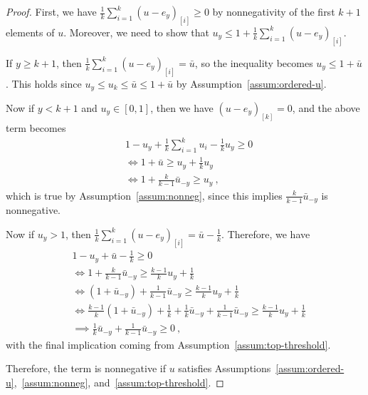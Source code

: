 \documentclass[12pt]{article}
\begin{document}
\begin{proof}
	First, we have $\frac 1 k \sum_{i=1}^k (u-e_y)_{[i]} \geq 0$ by nonnegativity of the first $k+1$ elements of $u$.
	Moreover, we need to show that $u_y \leq 1 + \frac 1 k \sum_{i=1}^k (u-e_y)_{[i]}$.
	
	If $y \geq k+1$, then $\frac 1 k \sum_{i=1}^k (u-e_y)_{[i]} = \bar u$, so the inequality becomes $u_y \leq 1 + \bar u$.
	This holds since $u_y \leq u_k \leq \bar u \leq 1 + \bar u$ by Assumption~\ref{assum:ordered-u}.
	
	Now if $y < k+1$ and $u_y \in [0,1]$, then we have $(u-e_y)_{[k]} = 0$, and the above term becomes
	\begin{align*}
	&1 -u_y + \frac{1}{k} \sum_{i=1}^{k} u_i - \frac 1 k u_y \geq 0\\
	&\iff 1 + \bar u \geq u_y + \frac{1}{k} u_y\\
	&\iff 1 + \frac k {k-1} \bar u_{-y} \geq u_y~,~
	\end{align*}
	which is true by Assumption~\ref{assum:nonneg}, since this implies $\frac{k}{k-1} \bar u_{-y}$ is nonnegative.
	
	Now if $u_y > 1$, then $\frac 1 k \sum_{i=1}^k (u-e_y)_{[i]} = \bar u - \frac 1 k$.
	Therefore, we have 
	\begin{align*}
	&1 -u_y + \bar u - \frac 1 k \geq 0\\
	&\iff 1 + \frac{k}{k-1}\bar u_{-y} \geq \frac{k-1}{k} u_y + \frac 1 k\\
	&\iff (1 + \bar u_{-y}) + \frac 1 {k-1} \bar u_{-y} \geq \frac{k-1}{k} u_y + \frac 1 k\\
	&\iff \frac{k-1}{k}(1 + \bar u_{-y}) + \frac 1 k + \frac{1}{k}\bar u_{-y} + \frac 1 {k-1} \bar u_{-y} \geq \frac{k-1}{k} u_y + \frac 1 k\\
	&\implies \frac{1}{k}\bar u_{-y}+ \frac{1}{k-1}\bar u_{-y} \geq 0~,~
	\end{align*}
	with the final implication coming from Assumption~\ref{assum:top-threshold}.
	
	Therefore, the term is nonnegative if $u$ satisfies Assumptions~\ref{assum:ordered-u},~\ref{assum:nonneg}, and~\ref{assum:top-threshold}.
\end{proof}
\end{document}
